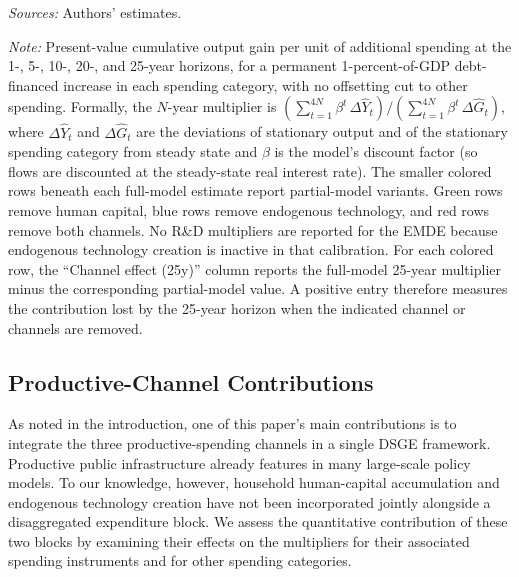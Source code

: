 \documentclass[a4paper,11pt]{article}
\newcommand{\tabnote}[2]{\vspace{2mm}\par\noindent\begin{minipage}{0.9\textwidth}\footnotesize\setlength{\parindent}{0pt}\emph{Sources: }#1\par\vspace{2mm}\emph{Note: }#2\end{minipage}}
\begin{document}
\begin{table}[H]
    \centering
    \caption{Implied Cumulative Public-Spending Multipliers by Horizon: Permanent Increases \label{tab:multipliers}}
    \footnotesize
    \renewcommand{\arraystretch}{1.2}
    

    \vspace{1mm}
    \tabnote{Authors' estimates.}{Present-value cumulative output gain per unit of additional spending at the 1-, 5-, 10-, 20-, and 25-year horizons, for a permanent 1-percent-of-GDP debt-financed increase in each spending category, with no offsetting cut to other spending.
Formally, the $N$-year multiplier is $\left(\sum_{t=1}^{4N}\beta^{t}\,\Delta \hat{Y}_t\right)\big/\left(\sum_{t=1}^{4N}\beta^{t}\,\Delta \hat{G}_t\right)$, where $\Delta \hat{Y}_t$ and $\Delta \hat{G}_t$ are the deviations of stationary output and of the stationary spending category from steady state and $\beta$ is the model's discount factor (so flows are discounted at the steady-state real interest rate).
The smaller colored rows beneath each full-model estimate report partial-model variants.
Green rows remove human capital, blue rows remove endogenous technology, and red rows remove both channels.
No R\&D multipliers are reported for the EMDE because endogenous technology creation is inactive in that calibration.
For each colored row, the ``Channel effect (25y)'' column reports the full-model 25-year multiplier minus the corresponding partial-model value.
A positive entry therefore measures the contribution lost by the 25-year horizon when the indicated channel or channels are removed.}
\end{table}

\subsection{Productive-Channel Contributions} \label{subsec:channelContributions}

As noted in the introduction, one of this paper's main contributions is to integrate the three productive-spending channels in a single DSGE framework.
Productive public infrastructure already features in many large-scale policy models.
To our knowledge, however, household human-capital accumulation and endogenous technology creation have not been incorporated jointly alongside a disaggregated expenditure block.
We assess the quantitative contribution of these two blocks by examining their effects on the multipliers for their associated spending instruments and for other spending categories.
\end{document}
